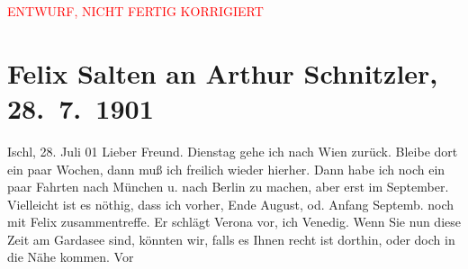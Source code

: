 
\begin{center}
            \textcolor{red}{ENTWURF, NICHT FERTIG KORRIGIERT}
                      \end{center}
            
         
         \renewcommand{\erwaehntePersonen}{Personen: Friedrich von Bodenstedt, Hugo Felix, Mirzä Şäfi Vazeh, Josef Willomitzer, Bogumil Zepler}
         \renewcommand{\erwaehnteOrte}{Orte: Bad Ischl, Berlin, Lago di Garda, München, Venedig, Verona, Wien}
         \renewcommand{\erwaehnteWerke}{Werke: Der einsame Weg. Schauspiel in fünf Akten, Die Gedenktafel der Prinzessin Anna, Die Insel. Monatsschrift mit Buchschmuck und Illustrationen, Hafisa, Neue Loreley}
               \section[Felix Salten an Arthur Schnitzler, 28. 7. 1901]{ Felix Salten an Arthur Schnitzler, 28. 7. 1901}\nopagebreak{}\rehead{ }\begin{ledgroupsized}[t]{13cm}\normalsize\beginnumbering \toendnotes[C]{\smallbreak\pagebreak[2]} 
\toendnotes[C]{\smallbreak}\pstart
           \raggedleft{}{\pb}Ischl, 28. Juli 01\pend
           \pstart
           Lieber Freund. Dienstag gehe ich nach Wien zurück.
               Bleibe dort ein paar Wochen, dann muß ich freilich wieder hierher. Dann habe ich noch
               ein paar Fahrten nach München u. nach Berlin zu machen, aber erst im
                  September. Vielleicht ist es nöthig, dass ich vorher, Ende
                  August, od. Anfang Septemb. noch mit Felix zusammentreffe. Er schlägt Verona vor, ich Venedig.
               Wenn Sie nun diese Zeit am Gardasee sind,
               könnten wir, falls es Ihnen recht ist dorthin, oder doch in die Nähe kommen. Vor

\end{ledgroupsized}
